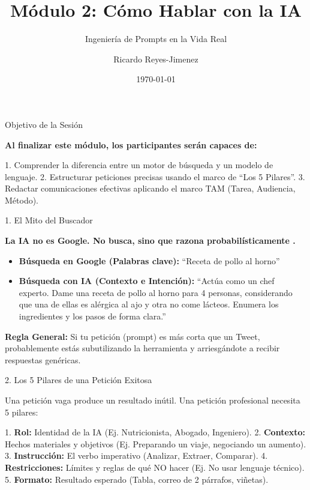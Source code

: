 \documentclass[aspectratio=169]{beamer}
\title[Módulo 2: Cómo Hablar con la I]{Módulo 2: Cómo Hablar con la IA}
\subtitle{Ingeniería de Prompts en la Vida Real}
\author{Ricardo Reyes-Jimenez}
\institute{IA para Todos}
\date{\today}
\begin{document}
\begin{frame}
  \titlepage
\end{frame}

\usebackgroundtemplate{}



\begin{frame}[fragile]{Objetivo de la Sesión}


\textbf{Al finalizar este módulo, los participantes serán capaces de:}

1. Comprender la diferencia entre un motor de búsqueda y un modelo de lenguaje.
2. Estructurar peticiones precisas usando el marco de ``Los 5 Pilares''.
3. Redactar comunicaciones efectivas aplicando el marco TAM (Tarea, Audiencia, Método).

\end{frame}



\begin{frame}[fragile]{1. El Mito del Buscador}


\textbf{La IA no es Google. No busca, sino que razona probabilísticamente \cite{openai2023}.}

\begin{itemize}
  \item \textbf{Búsqueda en Google (Palabras clave):} ``Receta de pollo al horno''
  \item \textbf{Búsqueda con IA (Contexto e Intención):} ``Actúa como un chef experto. Dame una receta de pollo al horno para 4 personas, considerando que una de ellas es alérgica al ajo y otra no come lácteos. Enumera los ingredientes y los pasos de forma clara.''
\end{itemize}
\textbf{Regla General:} Si tu petición (prompt) es más corta que un Tweet, probablemente estás subutilizando la herramienta y arriesgándote a recibir respuestas genéricas.

\end{frame}



\begin{frame}[fragile]{2. Los 5 Pilares de una Petición Exitosa}


Una petición vaga produce un resultado inútil. Una petición profesional necesita 5 pilares:

1. \textbf{Rol:} Identidad de la IA (Ej. Nutricionista, Abogado, Ingeniero).
2. \textbf{Contexto:} Hechos materiales y objetivos (Ej. Preparando un viaje, negociando un aumento).
3. \textbf{Instrucción:} El verbo imperativo (Analizar, Extraer, Comparar).
4. \textbf{Restricciones:} Límites y reglas de qué NO hacer (Ej. No usar lenguaje técnico).
5. \textbf{Formato:} Resultado esperado (Tabla, correo de 2 párrafos, viñetas).

\end{frame}
\end{document}
